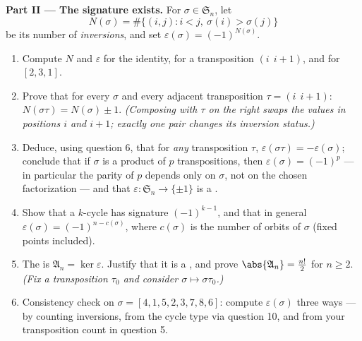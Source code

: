 \begin{problem}
\medskip
\noindent\textbf{Part II --- The signature exists.} For $\sigma
\in \mathfrak S_n$, let
\[
N(\sigma) = \#\bigl\{(i, j) : i < j,\ \sigma(i) >
\sigma(j)\bigr\}
\]
be its number of \emph{inversions}, and set $\varepsilon(\sigma) =
(-1)^{N(\sigma)}$.
\begin{enumerate}[resume]
  \item Compute $N$ and $\varepsilon$ for the identity, for a
        transposition $(i\ \ i{+}1)$, and for $[2, 3, 1]$.
  \item Prove that for every $\sigma$ and every adjacent
        transposition $\tau = (i\ \ i{+}1)$:
        $N(\sigma\tau) = N(\sigma) \pm 1$. \emph{(Composing with
        $\tau$ on the right swaps the values in positions $i$ and
        $i + 1$; exactly one pair changes its inversion
        status.)}
  \item Deduce, using question 6, that for \emph{any}
        transposition $\tau$, $\varepsilon(\sigma\tau) =
        -\varepsilon(\sigma)$; conclude that if $\sigma$ is a
        product of $p$ transpositions, then $\varepsilon(\sigma)
        = (-1)^p$ --- in particular the parity of $p$ depends only
        on $\sigma$, not on the chosen factorization --- and that
        $\varepsilon \colon \mathfrak S_n \to \{\pm 1\}$ is a
         .
  \item Show that a $k$-cycle has signature $(-1)^{k-1}$, and
        that in general $\varepsilon(\sigma) = (-1)^{n -
        c(\sigma)}$, where $c(\sigma)$ is the number of orbits of
        $\sigma$ (fixed points included).
  \item The \emph{} is $\mathfrak A_n =
        \ker\varepsilon$. Justify that it is a , and prove
        $\abs{\mathfrak A_n} = \frac{n!}2$ for $n \geq 2$.
        \emph{(Fix a transposition $\tau_0$ and consider $\sigma
        \mapsto \sigma\tau_0$.)}
  \item Consistency check on $\sigma = [4, 1, 5, 2, 3, 7, 8, 6]$:
        compute $\varepsilon(\sigma)$ three ways --- by counting
        inversions, from the cycle type via question 10, and from
        your transposition count in question 5.
\end{enumerate}


\end{problem}

